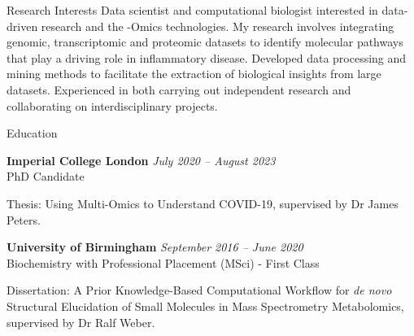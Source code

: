 \documentclass{resume}
\begin{document}
\begin{rSection}{Research Interests}
\vspace{1pt plus 1pt}
Data scientist and computational biologist interested in data-driven research and the -Omics technologies. My research involves integrating genomic, transcriptomic and proteomic datasets to identify molecular pathways that play a driving role in inflammatory disease. Developed data processing and mining methods to facilitate the extraction of biological insights from large datasets. Experienced in both carrying out independent research and collaborating on interdisciplinary projects.

\end{rSection}
\begin{rSection}{Education}

\vspace{1pt plus 1pt}
{\bf Imperial College London} \hfill {\em July 2020 -- August 2023} 
\\ PhD Candidate
\item Thesis: Using Multi-Omics to Understand COVID-19, supervised by Dr James Peters.


{\bf University of Birmingham} \hfill {\em September 2016 -- June 2020} 
\\ Biochemistry with Professional Placement (MSci) - First Class
\item Dissertation: A Prior Knowledge-Based Computational Workflow for \textit{de novo} Structural Elucidation of Small Molecules in Mass Spectrometry Metabolomics, supervised by Dr Ralf Weber.

\end{rSection}
\end{document}
